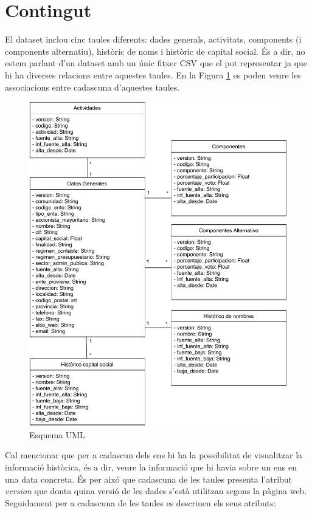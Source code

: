 \documentclass[12pt]{article}
\begin{document}
\section*{Contingut}
El dataset inclou cinc taules diferents: dades generals, activitats, components (i components alternatiu), històric de noms i històric de capital social. És a dir, no estem parlant d'un dataset amb un únic fitxer CSV que el pot representar ja que hi ha diverses relacions entre aquestes taules. En la Figura \ref{UML} es poden veure les associacions entre cadascuna d'aquestes taules.


\begin{figure}[H]
    \centering
    \includegraphics[width=0.7\columnwidth]{img/UML.pdf}
    \caption{Esquema UML} 
    \label{UML}
\end{figure}


Cal mencionar que per a cadascun dels ens hi ha la possibilitat de visualitzar la informació històrica, és a dir, veure la informació que hi havia sobre un ens en una data concreta. És per aixó que cadascuna de les taules presenta l'atribut \textit{version} que donta quina versió de les dades s'està utilitzan segons la pàgina web.
Seguidament per a cadascuna de les taules es descriuen els seus atributs:
\end{document}
